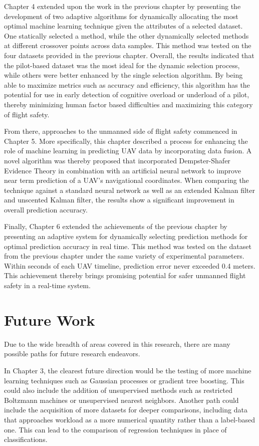 \documentclass[12pt]{uthesis-v12}  %
\begin{document}
Chapter 4 extended upon the work in the previous chapter by presenting the development of two adaptive algorithms for dynamically allocating the most optimal machine learning technique given the attributes of a selected dataset. One statically selected a method, while the other dynamically selected methods at different crossover points across data samples. This method was tested on the four datasets provided in the previous chapter. Overall, the results indicated that the pilot-based dataset was the most ideal for the dynamic selection process, while others were better enhanced by the single selection algorithm. By being able to maximize metrics such as accuracy and efficiency, this algorithm has the potential for use in early detection of cognitive overload or underload of a pilot, thereby minimizing human factor based difficulties and maximizing this category of flight safety.

From there, approaches to the unmanned side of flight safety commenced in Chapter 5. More specifically, this chapter described a process for enhancing the role of machine learning in predicting UAV data by incorporating data fusion. A novel algorithm was thereby proposed that incorporated Dempster-Shafer Evidence Theory in combination with an artificial neural network to improve near term prediction of a UAV's navigational coordinates. When comparing the technique against a standard neural network as well as an extended Kalman filter and unscented Kalman filter, the results show a significant improvement in overall prediction accuracy.

Finally, Chapter 6 extended the achievements of the previous chapter by presenting an adaptive system for dynamically selecting prediction methods for optimal prediction accuracy in real time. This method was tested on the dataset from the previous chapter under the same variety of experimental parameters. Within seconds of each UAV timeline, prediction error never exceeded 0.4 meters. This achievement thereby brings promising potential for safer unmanned flight safety in a real-time system.

\section{Future Work}

Due to the wide breadth of areas covered in this research, there are many possible paths for future research endeavors. 

In Chapter 3, the clearest future direction would be the testing of more machine learning techniques such as Gaussian processes or gradient tree boosting. This could also include the addition of unsupervised methods such as restricted Boltzmann machines or unsupervised nearest neighbors. Another path could include the acquisition of more datasets for deeper comparisons, including data that approaches workload as a more numerical quantity rather than a label-based one. This can lead to the comparison of regression techniques in place of classifications.
\end{document}
